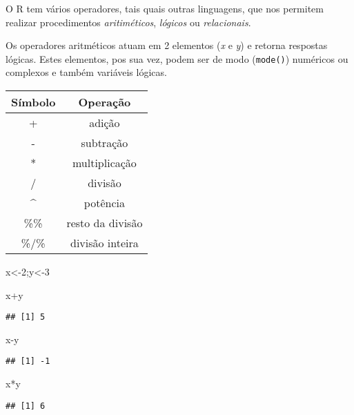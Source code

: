\documentclass[
]{book}
\newenvironment{Shaded}{\begin{snugshade}}{\end{snugshade}}
\newcommand{\DecValTok}[1]{\textcolor[rgb]{0.00,0.00,0.81}{#1}}
\newcommand{\NormalTok}[1]{#1}
\newcommand{\OtherTok}[1]{\textcolor[rgb]{0.56,0.35,0.01}{#1}}
\newcommand{\SpecialCharTok}[1]{\textcolor[rgb]{0.00,0.00,0.00}{#1}}
\begin{document}
O R tem vários operadores, tais quais outras linguagens, que nos permitem realizar procedimentos \emph{aritiméticos}, \emph{lógicos} ou \emph{relacionais}.

Os operadores aritméticos atuam em 2 elementos (\emph{x} e \emph{y}) e retorna respostas lógicas. Estes elementos, pos sua vez, podem ser de modo (\texttt{mode()}) numéricos ou complexos e também variáveis lógicas.

\begin{longtable}[]{@{}cc@{}}
\toprule
Símbolo & Operação \\
\midrule
\endhead
+ & adição \\
- & subtração \\
* & multiplicação \\
/ & divisão \\
\^{} & potência \\
\%\% & resto da divisão \\
\%/\% & divisão inteira \\
\bottomrule
\end{longtable}

\begin{Shaded}
\begin{Highlighting}[]
\NormalTok{x}\OtherTok{\textless{}{-}}\DecValTok{2}\NormalTok{;y}\OtherTok{\textless{}{-}}\DecValTok{3}

\NormalTok{x}\SpecialCharTok{+}\NormalTok{y}
\end{Highlighting}
\end{Shaded}

\begin{verbatim}
## [1] 5
\end{verbatim}

\begin{Shaded}
\begin{Highlighting}[]
\NormalTok{x}\SpecialCharTok{{-}}\NormalTok{y}
\end{Highlighting}
\end{Shaded}

\begin{verbatim}
## [1] -1
\end{verbatim}

\begin{Shaded}
\begin{Highlighting}[]
\NormalTok{x}\SpecialCharTok{*}\NormalTok{y}
\end{Highlighting}
\end{Shaded}

\begin{verbatim}
## [1] 6
\end{verbatim}
\end{document}
